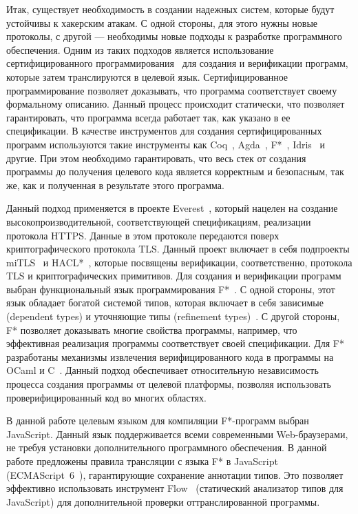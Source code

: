 Итак, существует необходимость в создании надежных систем, которые будут устойчивы к хакерским атакам. С одной стороны, для этого нужны новые протоколы, с другой --- необходимы новые подходы к разработке программного обеспечения. Одним из таких подходов является использование сертифицированного программирования~\cite{certifiedProgramming} для создания и верификации программ, которые затем транслируются в целевой язык. Сертифицированное программирование позволяет доказывать, что программа соответствует своему формальному описанию. Данный процесс происходит статически, что позволяет гарантировать, что программа всегда работает так, как указано в ее спецификации. В качестве инструментов для создания сертифицированных программ используются такие инструменты как Coq~\cite{coq}, Agda~\cite{agda}, F*~\cite{fstar}, Idris~\cite{idris} и другие.  При этом необходимо гарантировать, что весь стек от создания программы до получения целевого кода является корректным и безопасным, так же, как и полученная в результате этого программа. 

Данный подход применяется в проекте Everest~\cite{everest}, который нацелен на создание высокопроизводительной, соответствующей спецификациям, реализации протокола HTTPS. Данные в этом протоколе передаются поверх криптографического протокола TLS. Данный проект включает в себя подпроекты miTLS~\cite{mitls} и HACL*~\cite{hacl_star}, которые посвящены верификации, соответственно, протокола TLS и криптографических примитивов. Для создания и верификации программ выбран функциональный язык программирования F*~\cite{fstarCite}. С одной стороны, этот язык обладает богатой системой типов, которая включает в себя зависимые (dependent types) и уточняющие типы (refinement types)~\cite{certifiedProgramming}. С другой стороны, F* позволяет доказывать многие свойства программы, например, что эффективная реализация программы соответствует своей спецификации. Для F* разработаны механизмы извлечения верифицированного кода в программы на OCaml и C~\cite{kremlin}. Данный подход обеспечивает относительную независимость процесса создания программы от целевой платформы, позволяя использовать проверифицированный код во многих областях. 

В данной работе целевым языком для компиляции F*-программ выбран JavaScript. Данный язык поддерживается всеми современными Web-браузерами, не требуя установки дополнительного программного обеспечения. В данной работе предложены правила трансляции с языка F* в JavaScript (ECMAScript~6~\cite{specjs}), гарантирующие сохранение аннотации типов. Это позволяет эффективно использовать инструмент Flow~\cite{flow} (статический анализатор типов для JavaScript) для дополнительной проверки оттранслированной программы. %

